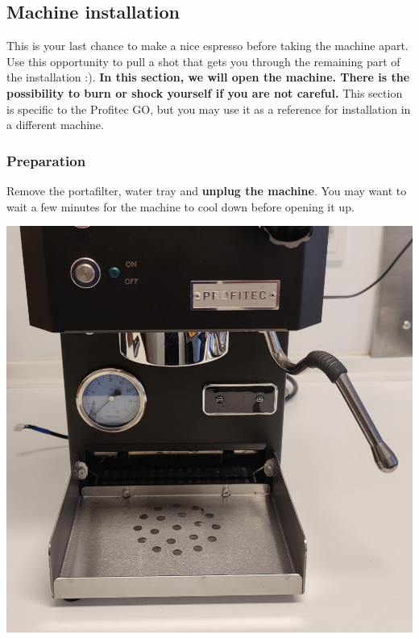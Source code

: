\documentclass[]{article}
\begin{document}
\subsection{Machine installation}
This is your last chance to make a nice espresso before taking the machine apart. Use this opportunity to pull a shot that gets you through the remaining part of the installation :). \textbf{In this section, we will open the machine. There is the possibility to burn or shock yourself if you are not careful.} This section is specific to the Profitec GO, but you may use it as a reference for installation in a different machine.

\subsubsection{Preparation}
\begin{minipage}[t]{0.5\linewidth}
	\vspace{0pt}
	Remove the portafilter, water tray and \textbf{unplug the machine}. You may want to wait a few minutes for the machine to cool down before opening it up. 
\end{minipage}
\hfill
\begin{minipage}[t]{0.4\linewidth}
	\vspace{0pt}
	\includegraphics[width=\linewidth]{images/03_installation/01_unplug_remove.jpg}
\end{minipage}
\end{document}
